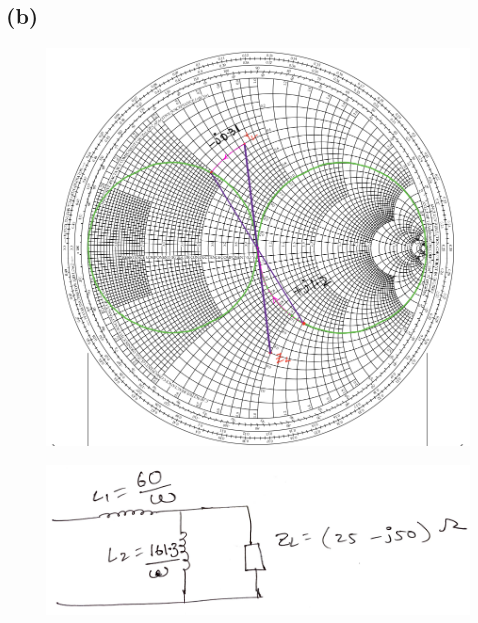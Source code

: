 \documentclass{article}
\begin{document}
\subsection*{(b)}
\begin{figure}[H]
	\includegraphics[scale=0.5]{./figs/q2b_s.png}
\end{figure}
\begin{figure}[H]
	\includegraphics[scale=0.3]{./figs/q2b.png}
\end{figure}
\end{document}
